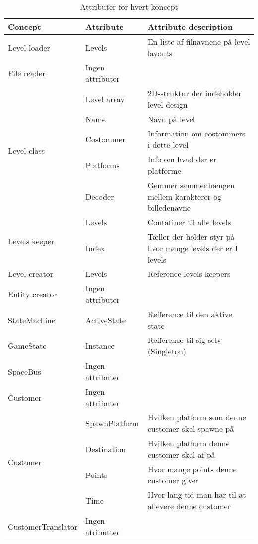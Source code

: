 \begin{table}[!h]
\hspace{-50pt}
\begin{tabular}{|l|l|l|}
\hline
\textbf{Concept}               & \textbf{Attribute} & \textbf{Attribute description}                              \\ \hline
Level loader                   & Levels             & En liste af filnavnene på level layouts                     \\ \hline
File reader                    & Ingen attributer   &                                                             \\ \hline
\multirow{5}{*}{Level class}   & Level array        & 2D-struktur der indeholder level design                     \\ \cline{2-3}
                               & Name               & Navn på level                                               \\ \cline{2-3}
                               & Costommer          & Information om costommers i dette level                     \\ \cline{2-3}
                               & Platforms          & Info om hvad der er platforme                               \\ \cline{2-3}
                               & Decoder            & Gemmer sammenhængen mellem karakterer og billedenavne       \\ \hline
\multirow{2}{*}{Levels keeper} & Levels             & Contatiner til alle levels                                  \\ \cline{2-3}
                               & Index              & Tæller der holder styr på hvor mange levels der er I levels \\ \hline
Level creator                  & Levels             & Reference levels keepers                                    \\ \hline
Entity creator                 & Ingen attributer   &                                                             \\ \hline
StateMachine & ActiveState & Refference til den aktive state \\\hline
GameState & Instance & Refference til sig selv (Singleton)\\\hline
SpaceBus & Ingen attributer & \\\hline
Customer & Ingen attributer & \\\hline
\multirow{4}{*}{Customer}   & SpawnPlatform        & Hvilken platform som denne customer skal spawne på                     
\\ \cline{2-3}
&Destination & Hvilken platform denne customer skal af på \\ \cline{2-3}
&Points &Hvor mange points denne customer giver \\ \cline{2-3}
&Time &Hvor lang tid man har til at aflevere denne customer \\ \hline
CustomerTranslator & Ingen atributter \\ \hline
\end{tabular}
\caption{Attributer for hvert koncept}
\label{attributes}
\end{table}

